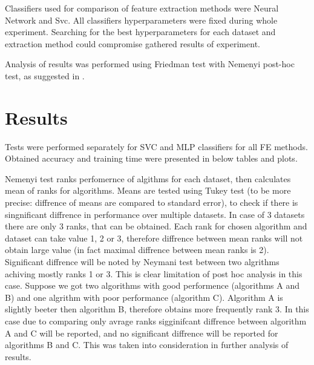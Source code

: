 \documentclass[a4paper, 10 pt, conference]{ieeeconf}
\begin{document}
Classifiers used for comparison of feature extraction methods were Neural Network and Svc. All classifiers hyperparameters were fixed during whole experiment. Searching for the best hyperparameters for each dataset and extraction method could compromise gathered results of experiment.

Analysis of results was performed using Friedman test with Nemenyi post-hoc test, as suggested in \cite{demsar}.

\section{Results}

Tests were performed separately for SVC and MLP classifiers for all FE methods. Obtained accuracy and training time were presented in below tables and plots.

Nemenyi test ranks perfomernce of algithms for each dataset, then calculates mean of ranks for algorithms. Means are tested using Tukey test (to be more precise: diffrence of means are compared to standard error), to check if there is singnificant diffrence in performance over multiple datasets. In case of 3 datasets there are only 3 ranks, that can be obtained. Each rank for chosen algorithm and dataset can take value 1, 2 or 3, therefore diffrence between mean ranks will not obtain large value (in fact maximal diffrence between mean ranks is 2). Significant diffrence will be noted by Neymani test between two algrithms achiving mostly ranks 1 or 3. This is clear limitation of post hoc analysis in this case. Suppose we got two algorithms with good performence (algorithms A and B) and one algrithm with poor performance (algorithm C). Algorithm A is slightly beeter then algorithm B, therefore obtains more frequently rank 3. In this case due to comparing only avrage ranks sigginifcant diffrence between algorithm A and C will be reported, and no significant diffrence will be reported for algorithms B and C. This was taken into consideration in further analysis of results.

\end{document}
